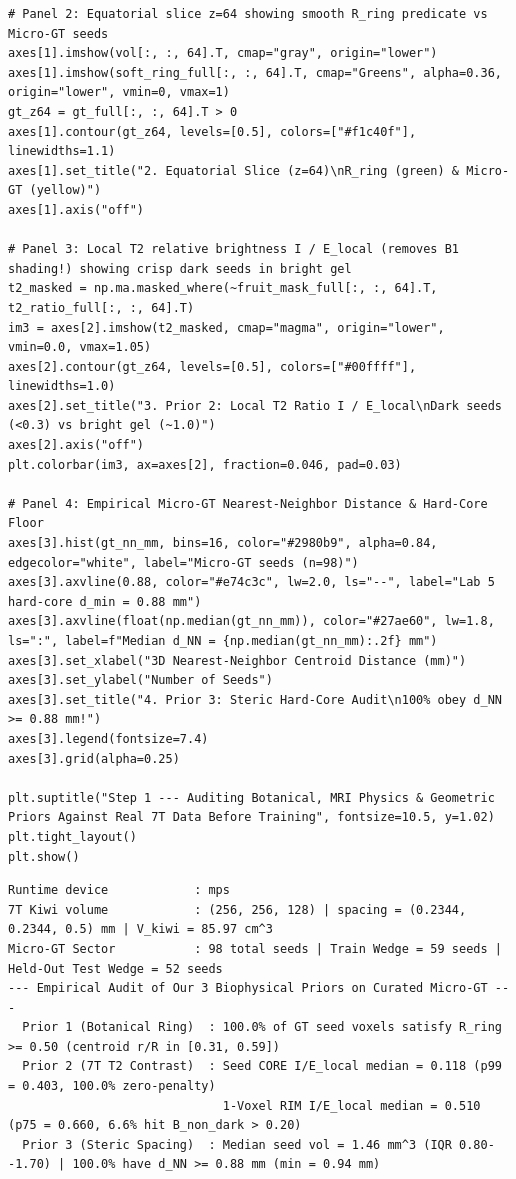 \documentclass[10pt,a4paper]{article}
\begin{document}
\begin{codebox}
\begin{lstlisting}[style=pybmed]
# Panel 2: Equatorial slice z=64 showing smooth R_ring predicate vs Micro-GT seeds
axes[1].imshow(vol[:, :, 64].T, cmap="gray", origin="lower")
axes[1].imshow(soft_ring_full[:, :, 64].T, cmap="Greens", alpha=0.36, origin="lower", vmin=0, vmax=1)
gt_z64 = gt_full[:, :, 64].T > 0
axes[1].contour(gt_z64, levels=[0.5], colors=["#f1c40f"], linewidths=1.1)
axes[1].set_title("2. Equatorial Slice (z=64)\nR_ring (green) & Micro-GT (yellow)")
axes[1].axis("off")

# Panel 3: Local T2 relative brightness I / E_local (removes B1 shading!) showing crisp dark seeds in bright gel
t2_masked = np.ma.masked_where(~fruit_mask_full[:, :, 64].T, t2_ratio_full[:, :, 64].T)
im3 = axes[2].imshow(t2_masked, cmap="magma", origin="lower", vmin=0.0, vmax=1.05)
axes[2].contour(gt_z64, levels=[0.5], colors=["#00ffff"], linewidths=1.0)
axes[2].set_title("3. Prior 2: Local T2 Ratio I / E_local\nDark seeds (<0.3) vs bright gel (~1.0)")
axes[2].axis("off")
plt.colorbar(im3, ax=axes[2], fraction=0.046, pad=0.03)

# Panel 4: Empirical Micro-GT Nearest-Neighbor Distance & Hard-Core Floor
axes[3].hist(gt_nn_mm, bins=16, color="#2980b9", alpha=0.84, edgecolor="white", label="Micro-GT seeds (n=98)")
axes[3].axvline(0.88, color="#e74c3c", lw=2.0, ls="--", label="Lab 5 hard-core d_min = 0.88 mm")
axes[3].axvline(float(np.median(gt_nn_mm)), color="#27ae60", lw=1.8, ls=":", label=f"Median d_NN = {np.median(gt_nn_mm):.2f} mm")
axes[3].set_xlabel("3D Nearest-Neighbor Centroid Distance (mm)")
axes[3].set_ylabel("Number of Seeds")
axes[3].set_title("4. Prior 3: Steric Hard-Core Audit\n100% obey d_NN >= 0.88 mm!")
axes[3].legend(fontsize=7.4)
axes[3].grid(alpha=0.25)

plt.suptitle("Step 1 --- Auditing Botanical, MRI Physics & Geometric Priors Against Real 7T Data Before Training", fontsize=10.5, y=1.02)
plt.tight_layout()
plt.show()
\end{lstlisting}
\end{codebox}
\begin{outbox}
\begin{lstlisting}[style=outbmed]
Runtime device            : mps
7T Kiwi volume            : (256, 256, 128) | spacing = (0.2344, 0.2344, 0.5) mm | V_kiwi = 85.97 cm^3
Micro-GT Sector           : 98 total seeds | Train Wedge = 59 seeds | Held-Out Test Wedge = 52 seeds
--- Empirical Audit of Our 3 Biophysical Priors on Curated Micro-GT ---
  Prior 1 (Botanical Ring)  : 100.0% of GT seed voxels satisfy R_ring >= 0.50 (centroid r/R in [0.31, 0.59])
  Prior 2 (7T T2 Contrast)  : Seed CORE I/E_local median = 0.118 (p99 = 0.403, 100.0% zero-penalty)
                              1-Voxel RIM I/E_local median = 0.510 (p75 = 0.660, 6.6% hit B_non_dark > 0.20)
  Prior 3 (Steric Spacing)  : Median seed vol = 1.46 mm^3 (IQR 0.80--1.70) | 100.0% have d_NN >= 0.88 mm (min = 0.94 mm)
\end{lstlisting}
\end{outbox}
\end{document}
